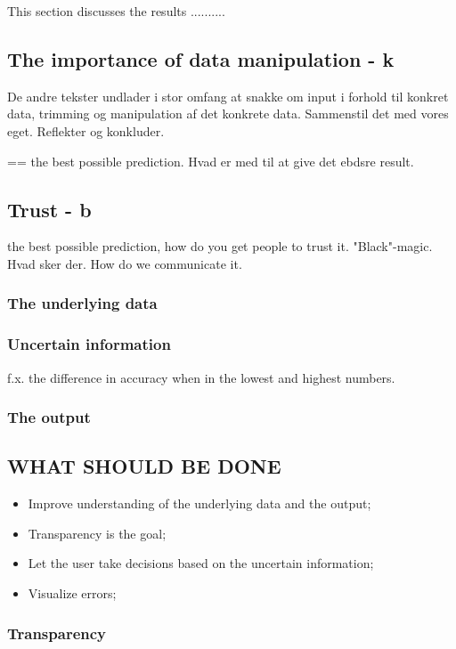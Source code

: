 This section discusses the results ..........

\subsection{The importance of data manipulation - k}
De andre tekster undlader i stor omfang at snakke om input i forhold til konkret data, trimming og manipulation af det konkrete data. Sammenstil det med vores eget. Reflekter og konkluder.

== the best possible prediction. Hvad er med til at give det ebdsre result. 

\subsection{Trust - b}
the best possible prediction, how do you get people to trust it. "Black"-magic. Hvad sker der.
How do we communicate it.

\subsubsection{The underlying data}

\subsubsection{Uncertain information}
f.x. the difference in accuracy when in the lowest and highest numbers.

\subsubsection{The output}


\subsection{WHAT SHOULD BE DONE}
\begin{itemize}
\item Improve understanding of the underlying data and the output;
\item Transparency is the goal;
\item Let the user take decisions based on the uncertain information;
\item Visualize errors;
\end{itemize}

\subsubsection{Transparency}

